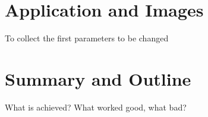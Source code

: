 \documentclass[a4paper, 12pt]{scrartcl}
\begin{document}
\newpage
\section{Application and Images }

To collect the first parameters to be changed 

\newpage
\section{Summary and Outline}
What is achieved?
What worked good, what bad?
{}


\newpage
\appendix
\end{document}
